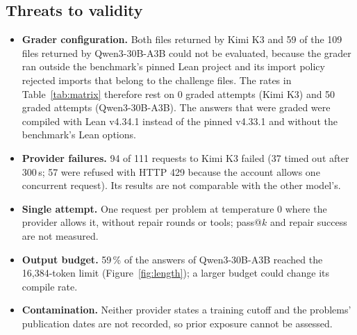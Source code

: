 \documentclass[11pt]{article}
\begin{document}
\clearpage
\subsection*{Threats to validity}
\begin{itemize}\setlength\itemsep{2pt}
\item \textbf{Grader configuration.} Both files returned by Kimi K3 and 59 of the 109 files returned by Qwen3-30B-A3B could not be evaluated, because the grader ran outside the benchmark's pinned Lean project and its import policy rejected imports that belong to the challenge files. The rates in Table~\ref{tab:matrix} therefore rest on 0 graded attempts (Kimi K3) and 50 graded attempts (Qwen3-30B-A3B). The answers that were graded were compiled with Lean v4.34.1 instead of the pinned v4.33.1 and without the benchmark's Lean options.
\item \textbf{Provider failures.} 94 of 111 requests to Kimi K3 failed (37 timed out after 300\,s; 57 were refused with HTTP 429 because the account allows one concurrent request). Its results are not comparable with the other model's.
\item \textbf{Single attempt.} One request per problem at temperature 0 where the provider allows it, without repair rounds or tools; pass@$k$ and repair success are not measured.
\item \textbf{Output budget.} 59\,\% of the answers of Qwen3-30B-A3B reached the 16{,}384-token limit (Figure~\ref{fig:length}); a larger budget could change its compile rate.
\item \textbf{Contamination.} Neither provider states a training cutoff and the problems' publication dates are not recorded, so prior exposure cannot be assessed.
\end{itemize}
\end{document}
